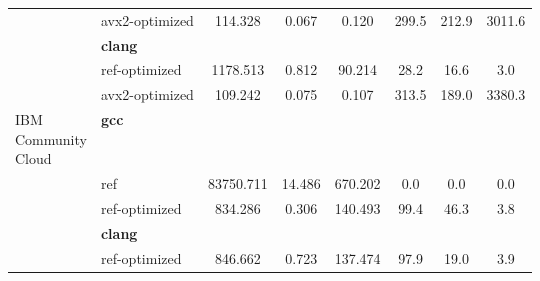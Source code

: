 \begin{table}
\begin{tabularx}{\linewidth}{l l c c c c c c}
          & avx2-optimized & 114.328 & 0.067 & 0.120 & 299.5 & 212.9 & 3011.6\\
          & \textbf{clang} & & & & & \\
          & ref-optimized & 1178.513 & 0.812 & 90.214 & 28.2 & 16.6 & 3.0\\
          & avx2-optimized & 109.242 & 0.075 & 0.107 & 313.5 & 189.0 & 3380.3\\
          \midrule
          \multirowcell{5}{IBM\\ Community\\ Cloud}
          & \textbf{gcc} & & & & & \\
          & ref & 83750.711 & 14.486 & 670.202 & 0.0 & 0.0 & 0.0\\
          & ref-optimized & 834.286 & 0.306 & 140.493 & 99.4 & 46.3 & 3.8\\
          & \textbf{clang} & & & & & \\
          & ref-optimized & 846.662 & 0.723 & 137.474 & 97.9 & 19.0 & 3.9\\
        \bottomrule
    \end{tabularx}
\end{table}
